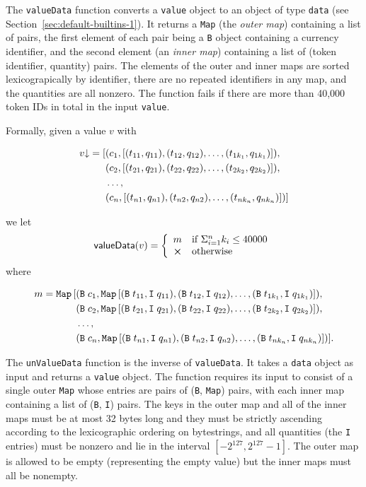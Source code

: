 \label{note:valueData-semantics}
The \texttt{valueData} function converts a \texttt{value} object to an object of
type \texttt{data} (see Section~\ref{sec:default-builtins-1}).  It returns
a \texttt{Map} (the \textit{outer map}) containing a list of pairs, the first
element of each pair being a \texttt{B} object containing a currency identifier,
and the second element (an \textit{inner map}) containing a list of (token
identifier, quantity) pairs.  The elements of the outer and inner maps are
sorted lexicograpically by identifier, there are no repeated identifiers in any
map, and the quantities are all nonzero.  The function fails if there are more
than 40,000 token IDs in total in the input \texttt{value}.

\medskip
\noindent Formally, given a value $v$ with

\begin{align*}
 \flatten{v}=
 [&(c_1, [(t_{11}, q_{11}), (t_{12}, q_{12}), \ldots, (t_{1k_1}, q_{1k_1})]),\\
  &(c_2, [(t_{21}, q_{21}), (t_{22}, q_{22}), \ldots, (t_{2k_2}, q_{2k_2})]),\\
  &\ldots,\\
  &(c_n, [(t_{n1}, q_{n1}), (t_{n2}, q_{n2}), \ldots, (t_{nk_n}, q_{nk_n})])]
\end{align*}

\noindent we let
$$
 \mathsf{valueData}(v) =
 \left\{
 \begin{array}{ll}
  m & \text{if $\Sigma_{i=1}^nk_i \leq 40000$}\\
  \errorX & \text{otherwise}
 \end{array}\right.
$$
\noindent
where

\begin{align*}
 m = \mathtt{Map}\,[
 &(\mathtt{B}\; c_1, \mathtt{Map}\,[(\mathtt{B}\; t_{11}, \mathtt{I}\; q_{11}), (\mathtt{B}\; t_{12}, \mathtt{I}\; q_{12}), \ldots, (\mathtt{B}\; t_{1k_1}, \mathtt{I}\; q_{1k_1})]),\\
 &(\mathtt{B}\; c_2, \mathtt{Map}\,[(\mathtt{B}\; t_{21}, \mathtt{I}\; q_{21}), (\mathtt{B}\; t_{22}, \mathtt{I}\; q_{22}), \ldots, (\mathtt{B}\; t_{2k_2}, \mathtt{I}\; q_{2k_2})]),\\
 &\ldots,\\
 &(\mathtt{B}\; c_n, \mathtt{Map}\,[(\mathtt{B}\; t_{n1}, \mathtt{I}\; q_{n1}), (\mathtt{B}\; t_{n2}, \mathtt{I}\; q_{n2}), \ldots, (\mathtt{B}\; t_{nk_n}, \mathtt{I}\; q_{nk_n})])].
\end{align*}


\label{note:unValueData-semantics}
The \texttt{unValueData} function is the inverse of \texttt{valueData}.  It
takes a \texttt{data} object as input and returns a \texttt{value} object.  The
function requires its input to consist of a single outer \texttt{Map} whose
entries are pairs of (\texttt{B}, \texttt{Map}) pairs, with each inner map
containing a list of (\texttt{B}, \texttt{I}) pairs.  The keys in the outer map
and all of the inner maps must be at most 32 bytes long and they must be
strictly ascending according to the lexicographic ordering on bytestrings, and
all quantities (the \texttt{I} entries) must be nonzero and lie in the interval
$[-2^{127}, 2^{127}-1]$.  The outer map is allowed to be empty (representing the
empty value) but the inner maps must all be nonempty.

